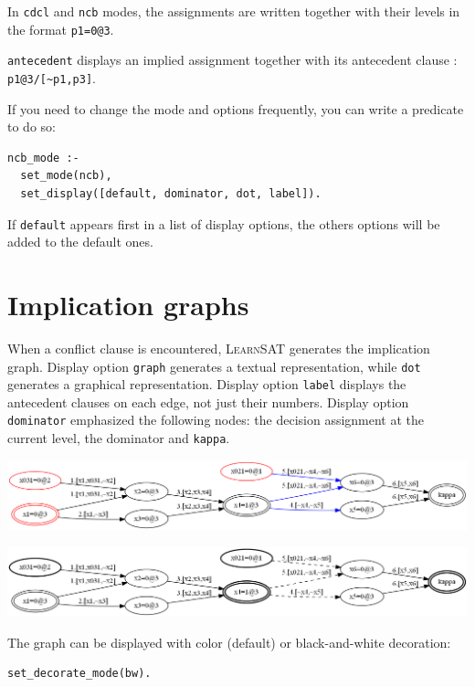 \documentclass[11pt]{article}
\newcommand*{\p}[1]{\textup{\texttt{#1}}}
\newcommand*{\ls}{\textsc{LearnSAT}}
\begin{document}
In \p{cdcl} and \p{ncb} modes, the assignments are written together with
their levels in the format \p{p1=0@3}.

\p{antecedent} displays an implied assignment together with its
antecedent clause : \verb+p1@3/[~p1,p3]+.

If you need to change the mode and options frequently, you can write a
predicate to do so:

\begin{verbatim}
ncb_mode :-
  set_mode(ncb), 
  set_display([default, dominator, dot, label]).
\end{verbatim}

If \p{default} appears first in a list of display options, the
others options will be added to the default ones.

\newpage

\section{Implication graphs}\label{s.impl}

When a conflict clause is encountered, \ls{} generates the implication
graph. Display option \p{graph} generates a textual representation,
while \p{dot} generates a graphical representation. Display option
\p{label} displays the antecedent clauses on each edge, not just their
numbers. Display option \p{dominator} emphasized the following nodes:
the decision assignment at the current level, the dominator and
\p{kappa}.

\begin{center}
\includegraphics[keepaspectratio=true,width=.9\textwidth]{graph-color}

\bigskip

\includegraphics[keepaspectratio=true,width=.9\textwidth]{graph-bw}
\end{center}

The graph can be displayed with color (default) or black-and-white
decoration:

\begin{verbatim}
set_decorate_mode(bw).
\end{verbatim}
\end{document}
